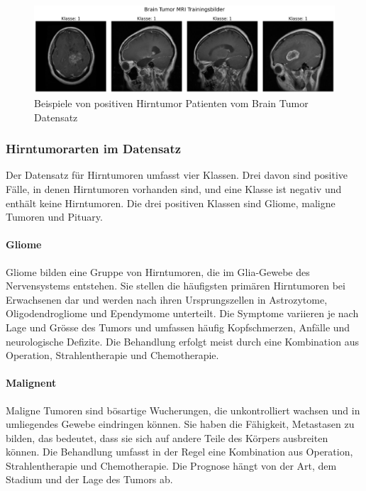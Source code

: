 \begin{figure}[H]
    \centering
    \includegraphics[width=\linewidth]{01-images/03-data/brain-klasse1.png}
    \caption{Beispiele von positiven Hirntumor Patienten vom Brain Tumor Datensatz}
    \label{fig:brain-beispiele-klasse1}
\end{figure}

\subsubsection{Hirntumorarten im Datensatz} \label{chap:brain-hirnarten-datensatz}
Der Datensatz für Hirntumoren umfasst vier Klassen. Drei davon sind positive Fälle, in denen Hirntumoren vorhanden sind, und eine Klasse ist negativ und enthält keine Hirntumoren. Die drei positiven Klassen sind Gliome, maligne Tumoren und Pituary.

\paragraph{Gliome} \label{chap:brain-gliome}
Gliome bilden eine Gruppe von Hirntumoren, die im Glia-Gewebe des Nervensystems entstehen. Sie stellen die häufigsten primären Hirntumoren bei Erwachsenen dar und werden nach ihren Ursprungszellen in Astrozytome, Oligodendrogliome und Ependymome unterteilt. Die Symptome variieren je nach Lage und Grösse des Tumors und umfassen häufig Kopfschmerzen, Anfälle und neurologische Defizite. Die Behandlung erfolgt meist durch eine Kombination aus Operation, Strahlentherapie und Chemotherapie.

\paragraph{Malignent} \label{chap:brain-malignent}
Maligne Tumoren sind bösartige Wucherungen, die unkontrolliert wachsen und in umliegendes Gewebe eindringen können. Sie haben die Fähigkeit, Metastasen zu bilden, das bedeutet, dass sie sich auf andere Teile des Körpers ausbreiten können. Die Behandlung umfasst in der Regel eine Kombination aus Operation, Strahlentherapie und Chemotherapie. Die Prognose hängt von der Art, dem Stadium und der Lage des Tumors ab.

